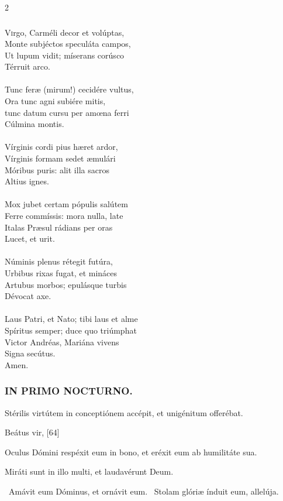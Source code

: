 \documentclass[9pt,twoside]{extarticle}
\begin{document}
\begin{multicols}{2}
\subsubsection*{\center {}}
\lettrine{V}irgo, Carméli decor et volúptas,\\
Monte subjéctos speculáta campos,\\
Ut lupum vidit; míserans corúsco\\
Térruit arco.\\
\\
Tunc feræ (mirum!) cecidére vultus,\\
Ora tunc agni subiére mitis,\\
tunc datum cursu per amœna ferri\\
Cúlmina montis.\\
\\
Vírginis cordi pius hæret ardor,\\
Vírginis formam sedet æmulári\\
Móribus puris: alit illa sacros\\
Altius ignes.\\
\\
Mox jubet certam pópulis salútem\\
Ferre commíssis: mora nulla, late\\
Italas Præsul rádians per oras\\
Lucet, et urit.\\
\\
Núminis plenus rétegit futúra,\\
Urbibus rixas fugat, et mináces\\
Artubus morbos; epulásque turbis\\
Dévocat axe.\\
\\
Laus Patri, et Nato; tibi laus et alme\\
Spíritus semper; duce quo triúmphat\\
Victor Andréas, Mariána vivens\\
Signa secútus.\\
Amen.

\subsubsection*{\center \textsc{IN PRIMO NOCTURNO.}}
\begin{tightlist}{}
\item {} Stérilis virtútem in conceptiónem accépit, et unigénitum offerébat.
\item {} Beátus vir,  [64]
\item {} Oculus Dómini respéxit eum in bono, et eréxit eum ab humilitáte sua.
\item {} Miráti sunt in illo multi, et laudavérunt Deum.
\item {}~Amávit eum Dóminus, et ornávit eum. ~Stolam glóriæ índuit eum, allelúja.
\item {}
\end{tightlist}


\end{multicols}
\end{document}
